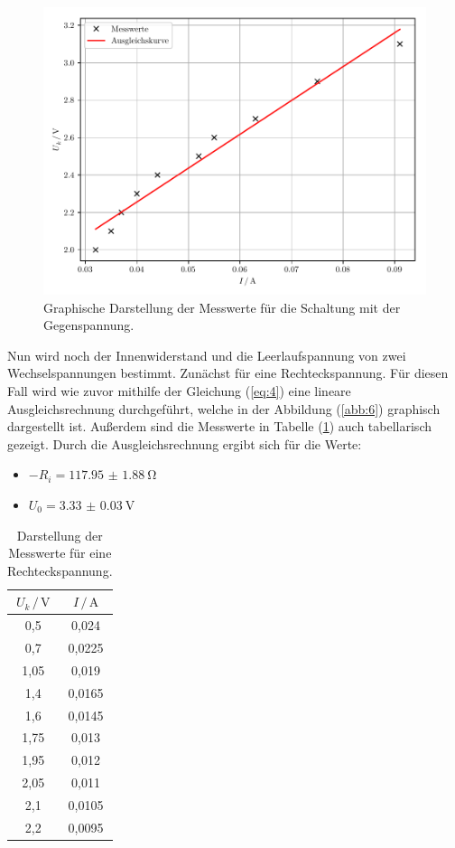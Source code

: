 \begin{figure}[H]
  \centering
  \includegraphics{plot2.pdf}
  \caption{Graphische Darstellung der Messwerte für die Schaltung mit der Gegenspannung.}
  \label{abb:5}
\end{figure}

Nun wird noch der Innenwiderstand und die Leerlaufspannung von zwei Wechselspannungen bestimmt.
Zunächst für eine Rechteckspannung. Für diesen Fall wird wie zuvor mithilfe der Gleichung
(\ref{eq:4}) eine lineare Ausgleichsrechnung durchgeführt, welche in der Abbildung
(\ref{abb:6}) graphisch dargestellt ist. Außerdem sind die Messwerte in Tabelle (\ref{tab:3})
auch tabellarisch gezeigt.
Durch die Ausgleichsrechnung ergibt sich für die Werte:

\begin{itemize}
  \item $-R_i = \SI{117.95(188)}{\ohm}$
  \item $U_0 = \SI{3.33(3)}{\volt}$
\end{itemize}

\begin{table}[H]
  \centering
  \caption{Darstellung der Messwerte für eine Rechteckspannung.}
  \label{tab:3}
  \begin{tabular}{c c}
    \toprule
    $U_k \, / \, \si{\volt}$ & $ I \, / \, \si{\ampere}$ \\
    \midrule
    0,5  & 0,024  \\
    0,7  & 0,0225 \\
    1,05 & 0,019  \\
    1,4  & 0,0165 \\
    1,6  & 0,0145 \\
    1,75 & 0,013  \\
    1,95 & 0,012  \\
    2,05 & 0,011  \\
    2,1  & 0,0105 \\
    2,2  & 0,0095 \\
    \bottomrule
  \end{tabular}
\end{table}


